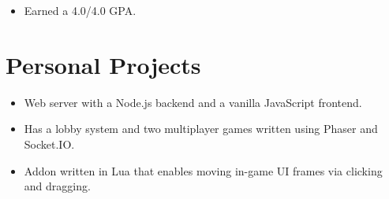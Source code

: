 \documentclass[letterpaper]{resume}
\begin{document}
\begin{minipage}[t]{0.72\textwidth}
\begin{itemize}
\item Earned a 4.0/4.0 GPA.
\end{itemize}

\sectionspace %


\section{Personal Projects}

\begin{itemize}
\item Web server with a Node.js backend and a vanilla JavaScript frontend.
\item Has a lobby system and two multiplayer games written using Phaser and Socket.IO.
\end{itemize}

\sectionspace %


\begin{itemize}
\item Addon written in Lua that enables moving in-game UI frames via clicking and dragging.
\end{itemize}

\sectionspace %


\end{minipage} %
\end{document}
